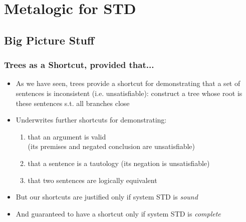 ﻿%

\setcounter{section}{4}
\section{Metalogic for STD}

\begin{frame}

\scriptsize{\tableofcontents}

\end{frame}

\subsection{Big Picture Stuff}

\begin{frame}
\frametitle{Trees as a Shortcut, provided that...}

\begin{itemize}[<+->]

\item As we have seen, trees provide a shortcut for demonstrating that a set of sentences is inconsistent (i.e. unsatisfiable): construct a tree whose root is these sentences s.t. all branches close

\item Underwrites further shortcuts for demonstrating:

\begin{enumerate}[1.)]

\item that an argument is valid \\ (its premises and negated conclusion are unsatisfiable)

\item that a sentence is a tautology (its negation is unsatisfiable)

\item that two sentences are logically equivalent 

\end{enumerate}

\item But our shortcuts are justified only if system STD is \textit{sound}

\item And guaranteed to have a shortcut only if system STD is \textit{complete}



\end{itemize}
\end{frame}

